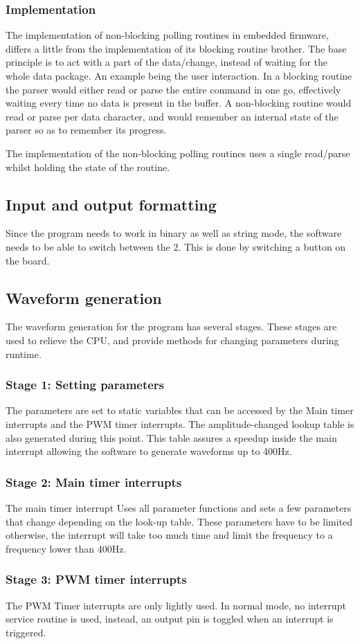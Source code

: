 \subsubsection{Implementation}
The implementation of non-blocking polling routines in embedded firmware, differs a little
from the implementation of its blocking routine brother. The base principle is to act with
a part of the data/change, instead of waiting for the whole data package. An example being
the user interaction. In a blocking routine the parser would either read or parse the entire
command in one go, effectively waiting every time no data is present in the buffer.
A non-blocking routine would read or parse per data character, and would remember an internal
state of the parser so as to remember its progress.

The implementation of the non-blocking polling routines uses a single read/parse whilst
holding the state of the routine.

\subsection{Input and output formatting}
Since the program needs to work in binary as well as string mode, the software needs to
be able to switch between the 2. This is done by switching a button on the board.

\subsection{Waveform generation}
The waveform generation for the program has several stages. These stages are used
to relieve the CPU, and provide methods for changing parameters during runtime.
\subsubsection{Stage 1: Setting parameters}
The parameters are set to static variables that can be accessed by the Main timer interrupts
and the PWM timer interrupts. The amplitude-changed lookup table is also generated during this
point. This table assures a speedup inside the main interrupt allowing the software to generate
waveforms up to 400Hz.
\subsubsection{Stage 2: Main timer interrupts}
The main timer interrupt Uses all parameter functions and sets a few parameters that change
depending on the look-up table. These parameters have to be limited otherwise, the interrupt
will take too much time and limit the frequency to a frequency lower than 400Hz.
\subsubsection{Stage 3: PWM timer interrupts}
The PWM Timer interrupts are only lightly used. In normal mode, no interrupt service routine is used, instead, an output pin is toggled when an interrupt is triggered.

